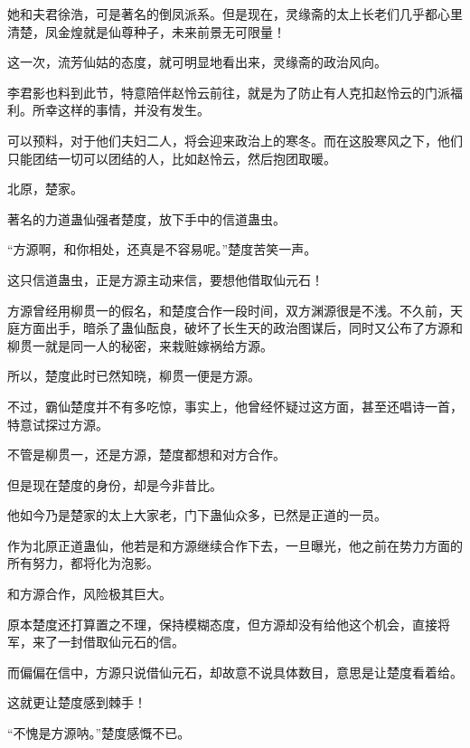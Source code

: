 \begin{this_body}
她和夫君徐浩，可是著名的倒凤派系。但是现在，灵缘斋的太上长老们几乎都心里清楚，凤金煌就是仙尊种子，未来前景无可限量！

这一次，流芳仙姑的态度，就可明显地看出来，灵缘斋的政治风向。

李君影也料到此节，特意陪伴赵怜云前往，就是为了防止有人克扣赵怜云的门派福利。所幸这样的事情，并没有发生。

可以预料，对于他们夫妇二人，将会迎来政治上的寒冬。而在这股寒风之下，他们只能团结一切可以团结的人，比如赵怜云，然后抱团取暖。

北原，楚家。

著名的力道蛊仙强者楚度，放下手中的信道蛊虫。

“方源啊，和你相处，还真是不容易呢。”楚度苦笑一声。

这只信道蛊虫，正是方源主动来信，要想他借取仙元石！

方源曾经用柳贯一的假名，和楚度合作一段时间，双方渊源很是不浅。不久前，天庭方面出手，暗杀了蛊仙酝良，破坏了长生天的政治图谋后，同时又公布了方源和柳贯一就是同一人的秘密，来栽赃嫁祸给方源。

所以，楚度此时已然知晓，柳贯一便是方源。

不过，霸仙楚度并不有多吃惊，事实上，他曾经怀疑过这方面，甚至还唱诗一首，特意试探过方源。

不管是柳贯一，还是方源，楚度都想和对方合作。

但是现在楚度的身份，却是今非昔比。

他如今乃是楚家的太上大家老，门下蛊仙众多，已然是正道的一员。

作为北原正道蛊仙，他若是和方源继续合作下去，一旦曝光，他之前在势力方面的所有努力，都将化为泡影。

和方源合作，风险极其巨大。

原本楚度还打算置之不理，保持模糊态度，但方源却没有给他这个机会，直接将军，来了一封借取仙元石的信。

而偏偏在信中，方源只说借仙元石，却故意不说具体数目，意思是让楚度看着给。

这就更让楚度感到棘手！

“不愧是方源呐。”楚度感慨不已。

\end{this_body}

